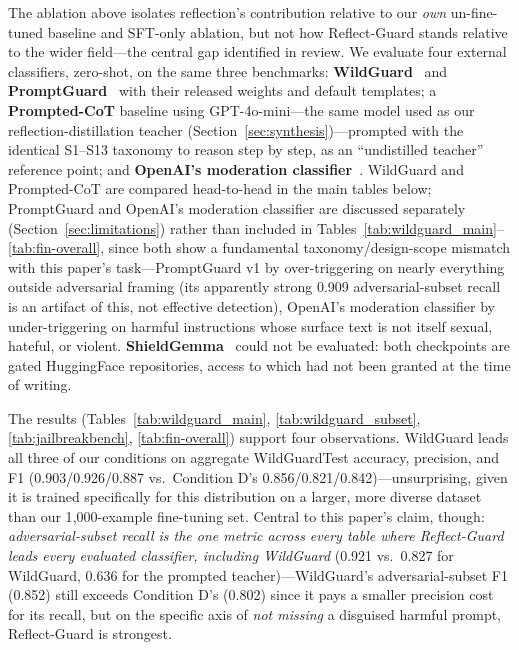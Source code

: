 \documentclass[superintelligence,article,submit,pdftex,moreauthors]{Definitions/mdpi}
\begin{document}
The ablation above isolates reflection's contribution relative to our \emph{own} un-fine-tuned baseline and SFT-only ablation, but not how Reflect-Guard stands relative to the wider field---the central gap identified in review. We evaluate four external classifiers, zero-shot, on the same three benchmarks: \textbf{WildGuard}~\citep{han2024wildguard} and \textbf{PromptGuard}~\citep{meta2024promptguard} with their released weights and default templates; a \textbf{Prompted-CoT} baseline using GPT-4o-mini---the same model used as our reflection-distillation teacher (Section~\ref{sec:synthesis})---prompted with the identical S1--S13 taxonomy to reason step by step, as an ``undistilled teacher'' reference point; and \textbf{OpenAI's moderation classifier}~\citep{markov2023holistic}. WildGuard and Prompted-CoT are compared head-to-head in the main tables below; PromptGuard and OpenAI's moderation classifier are discussed separately (Section~\ref{sec:limitations}) rather than included in Tables~\ref{tab:wildguard_main}--\ref{tab:fin-overall}, since both show a fundamental taxonomy/design-scope mismatch with this paper's task---PromptGuard v1 by over-triggering on nearly everything outside adversarial framing (its apparently strong 0.909 adversarial-subset recall is an artifact of this, not effective detection), OpenAI's moderation classifier by under-triggering on harmful instructions whose surface text is not itself sexual, hateful, or violent. \textbf{ShieldGemma}~\citep{zeng2024shieldgemma} could not be evaluated: both checkpoints are gated HuggingFace repositories, access to which had not been granted at the time of writing.

The results (Tables~\ref{tab:wildguard_main}, \ref{tab:wildguard_subset}, \ref{tab:jailbreakbench}, \ref{tab:fin-overall}) support four observations. WildGuard leads all three of our conditions on aggregate WildGuardTest accuracy, precision, and F1 (0.903/0.926/0.887 vs.\ Condition D's 0.856/0.821/0.842)---unsurprising, given it is trained specifically for this distribution on a larger, more diverse dataset than our 1{,}000-example fine-tuning set. Central to this paper's claim, though: \emph{adversarial-subset recall is the one metric across every table where Reflect-Guard leads every evaluated classifier, including WildGuard} (0.921 vs.\ 0.827 for WildGuard, 0.636 for the prompted teacher)---WildGuard's adversarial-subset F1 (0.852) still exceeds Condition D's (0.802) since it pays a smaller precision cost for its recall, but on the specific axis of \emph{not missing} a disguised harmful prompt, Reflect-Guard is strongest.
\end{document}
